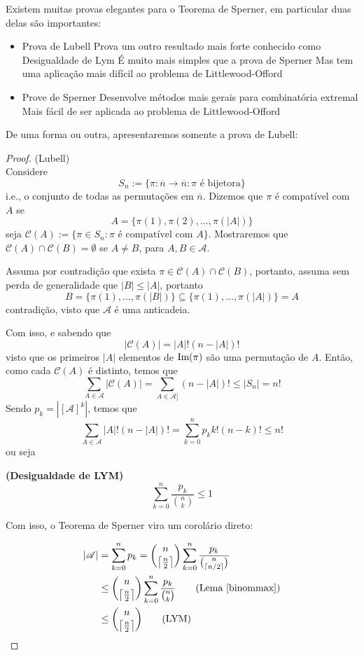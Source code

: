 \documentclass[11pt]{article}
\newcommand{\mc}[1]{\mathcal{#1}}
\newcommand{\ol}[1]{\overline{#1}}
\newcommand{\im}[1]{\text{\normalfont Im}(#1)}
\newcommand\ceil[1]{{\left\lceil#1\right\rceil}}
\newcommand{\cl}[1]{\colorlet{shadecolor}{#1}}
\begin{document}
Existem muitas provas elegantes para o Teorema de Sperner, em particular duas delas são importantes:
\begin{itemize}
    \item Prova de Lubell
        \subitem Prova um outro resultado mais forte conhecido como Desigualdade de Lym
        \subitem É muito mais simples que a prova de Sperner
        \subitem Mas tem uma aplicação mais difícil ao problema de Littlewood-Offord
    \item Prove de Sperner
        \subitem Desenvolve métodos mais gerais para combinatória extremal
        \subitem Mais fácil de ser aplicada ao problema de Littlewood-Offord
\end{itemize}

De uma forma ou outra, apresentaremos somente a prova de Lubell:

\cl{orange!15}

\begin{proof}(Lubell)\\
    Considere
    $$S_n:=\{\pi:\ol{n}\to\ol{n}:\pi\text{ é bijetora}\}$$
    i.e., o conjunto de todas as permutações em $\ol{n}$. Dizemos que $\pi$ é compatível com $A$ se
    $$A=\{\pi(1),\pi(2),\dots,\pi(|A|)\}$$
    seja $\mc{C}(A):=\{\pi\in S_n:\pi\text{ é compatível com }A\}$. Mostraremos que $\mc{C}(A)\cap\mc{C}(B)=\emptyset$ se $A\neq B$, para $A,B\in\mathscr{A}$.

    Assuma por contradição que exista $\pi\in\mc{C}(A)\cap\mc{C}(B)$, portanto, assuma sem perda de generalidade que $|B|\leq|A|$, portanto
    $$B=\{\pi(1),\dots,\pi(|B|)\}\subseteq\{\pi(1),\dots,\pi(|A|)\}=A$$
    contradição, visto que $\mathscr{A}$ é uma anticadeia.

    Com isso, e sabendo que
    $$|\mc{C}(A)|=|A|!(n-|A|)!$$
    visto que os primeiros $|A|$ elementos de $\im{\pi}$ são uma permutação de $A$. Então, como cada $\mc{C}(A)$ é distinto, temos que
    $$\sum_{A\in\mathscr{A}}|\mc{C}(A)|=\sum_{A\in\mc{A]}}(n-|A|)!\leq|S_n|=n!$$
    Sendo $p_k=|[\mathscr{A}]^k|$, temos que
    $$\sum_{A\in\mathscr{A}}|A|!(n-|A|)!=\sum_{k=0}^np_kk!(n-k)!\leq n!$$
    ou seja

    \begin{shaded}
    \begin{theorem}\textbf{(Desigualdade de LYM)}
    \label{lym}
        $$\sum_{k=0}^n\frac{p_k}{\binom{n}{k}}\leq1$$
    \end{theorem}
    \end{shaded}

    Com isso, o Teorema de Sperner vira um corolário direto:

    \begin{align*}
        |\mathscr{A}| & = \sum_{k=0}^np_k = \binom{n}{\ceil{\frac{n}{2}}}\sum_{k=0}^n\frac{p_k}{\binom{n}{\ceil{n/2}}}\\
        & \leq \binom{n}{\ceil{\frac{n}{2}}}\sum_{k=0}^n\frac{p_k}{\binom{n}{k}} \tag{Lema \ref{binommax}}\\
        & \leq \binom{n}{\ceil{\frac{n}{2}}} \tag{LYM}
    \end{align*}
\end{proof}
\end{document}
